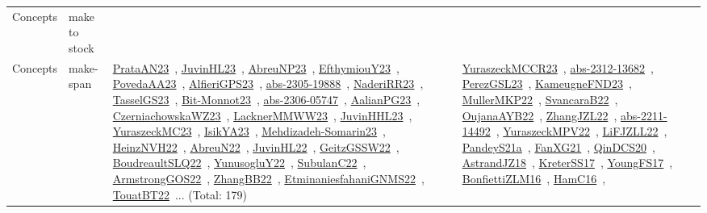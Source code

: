 {\begin{longtable}{lp{3cm}>{\raggedright\arraybackslash}p{6cm}>{\raggedright\arraybackslash}p{6cm}>{\raggedright\arraybackslash}p{8cm}}
Concepts & make to stock &  &  & \\
Concepts & make-span & \href{works/PrataAN23.pdf}{PrataAN23}~\cite{PrataAN23}, \href{works/JuvinHL23.pdf}{JuvinHL23}~\cite{JuvinHL23}, \href{works/AbreuNP23.pdf}{AbreuNP23}~\cite{AbreuNP23}, \href{works/EfthymiouY23.pdf}{EfthymiouY23}~\cite{EfthymiouY23}, \href{works/PovedaAA23.pdf}{PovedaAA23}~\cite{PovedaAA23}, \href{works/AlfieriGPS23.pdf}{AlfieriGPS23}~\cite{AlfieriGPS23}, \href{works/abs-2305-19888.pdf}{abs-2305-19888}~\cite{abs-2305-19888}, \href{works/NaderiRR23.pdf}{NaderiRR23}~\cite{NaderiRR23}, \href{works/TasselGS23.pdf}{TasselGS23}~\cite{TasselGS23}, \href{works/Bit-Monnot23.pdf}{Bit-Monnot23}~\cite{Bit-Monnot23}, \href{works/abs-2306-05747.pdf}{abs-2306-05747}~\cite{abs-2306-05747}, \href{works/AalianPG23.pdf}{AalianPG23}~\cite{AalianPG23}, \href{works/CzerniachowskaWZ23.pdf}{CzerniachowskaWZ23}~\cite{CzerniachowskaWZ23}, \href{works/LacknerMMWW23.pdf}{LacknerMMWW23}~\cite{LacknerMMWW23}, \href{works/JuvinHHL23.pdf}{JuvinHHL23}~\cite{JuvinHHL23}, \href{works/YuraszeckMC23.pdf}{YuraszeckMC23}~\cite{YuraszeckMC23}, \href{works/IsikYA23.pdf}{IsikYA23}~\cite{IsikYA23}, \href{works/Mehdizadeh-Somarin23.pdf}{Mehdizadeh-Somarin23}~\cite{Mehdizadeh-Somarin23}, \href{works/HeinzNVH22.pdf}{HeinzNVH22}~\cite{HeinzNVH22}, \href{works/AbreuN22.pdf}{AbreuN22}~\cite{AbreuN22}, \href{works/JuvinHL22.pdf}{JuvinHL22}~\cite{JuvinHL22}, \href{works/GeitzGSSW22.pdf}{GeitzGSSW22}~\cite{GeitzGSSW22}, \href{works/BoudreaultSLQ22.pdf}{BoudreaultSLQ22}~\cite{BoudreaultSLQ22}, \href{works/YunusogluY22.pdf}{YunusogluY22}~\cite{YunusogluY22}, \href{works/SubulanC22.pdf}{SubulanC22}~\cite{SubulanC22}, \href{works/ArmstrongGOS22.pdf}{ArmstrongGOS22}~\cite{ArmstrongGOS22}, \href{works/ZhangBB22.pdf}{ZhangBB22}~\cite{ZhangBB22}, \href{works/EtminaniesfahaniGNMS22.pdf}{EtminaniesfahaniGNMS22}~\cite{EtminaniesfahaniGNMS22}, \href{works/TouatBT22.pdf}{TouatBT22}~\cite{TouatBT22}... (Total: 179) & \href{works/YuraszeckMCCR23.pdf}{YuraszeckMCCR23}~\cite{YuraszeckMCCR23}, \href{works/abs-2312-13682.pdf}{abs-2312-13682}~\cite{abs-2312-13682}, \href{works/PerezGSL23.pdf}{PerezGSL23}~\cite{PerezGSL23}, \href{works/KameugneFND23.pdf}{KameugneFND23}~\cite{KameugneFND23}, \href{works/MullerMKP22.pdf}{MullerMKP22}~\cite{MullerMKP22}, \href{works/SvancaraB22.pdf}{SvancaraB22}~\cite{SvancaraB22}, \href{works/OujanaAYB22.pdf}{OujanaAYB22}~\cite{OujanaAYB22}, \href{works/ZhangJZL22.pdf}{ZhangJZL22}~\cite{ZhangJZL22}, \href{works/abs-2211-14492.pdf}{abs-2211-14492}~\cite{abs-2211-14492}, \href{works/YuraszeckMPV22.pdf}{YuraszeckMPV22}~\cite{YuraszeckMPV22}, \href{works/LiFJZLL22.pdf}{LiFJZLL22}~\cite{LiFJZLL22}, \href{works/PandeyS21a.pdf}{PandeyS21a}~\cite{PandeyS21a}, \href{works/FanXG21.pdf}{FanXG21}~\cite{FanXG21}, \href{works/QinDCS20.pdf}{QinDCS20}~\cite{QinDCS20}, \href{works/AstrandJZ18.pdf}{AstrandJZ18}~\cite{AstrandJZ18}, \href{works/KreterSS17.pdf}{KreterSS17}~\cite{KreterSS17}, \href{works/YoungFS17.pdf}{YoungFS17}~\cite{YoungFS17}, \href{works/BonfiettiZLM16.pdf}{BonfiettiZLM16}~\cite{BonfiettiZLM16}, \href{works/HamC16.pdf}{HamC16}~\cite{HamC16}, 
\end{longtable}}
